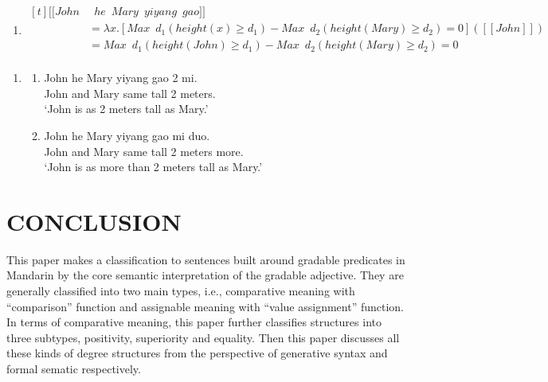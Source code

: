 \documentclass{ctexart}
\begin{document}
\begin{enumerate}
\begin{enumerate}
        \item \label{equality_example_3_d}
        $\begin{aligned}[t]
            [\![John &\enspace he \enspace Mary \enspace yiyang \enspace gao]\!] \\
            &= \lambda x.[Max \enspace d_1 (height(x) \geq d_1) - Max \enspace d_2 (height(Mary) \geq d_2) = 0]([\![John]\!]) \\
            &= Max \enspace d_1 (height(John) \geq d_1) - Max \enspace d_2 (height(Mary) \geq d_2) = 0 \\
        \end{aligned}$
    \end{enumerate}
\end{enumerate}

\begin{enumerate}
    \item \label{equality_example_1}
    \begin{enumerate}
        \item \label{equality_example_1_a}
        John he \enspace Mary yiyang gao 2 mi. \\
        John and Mary \enspace same tall 2 meters. \\
        `John is as 2 meters tall as Mary.'

        \item \label{equality_example_1_b}
        John he \enspace Mary yiyang gao  mi \enspace \enspace duo. \\
        John and Mary \enspace same tall 2 meters more. \\
        `John is as more than 2 meters tall as Mary.'
    \end{enumerate}
\end{enumerate}

\section{CONCLUSION}

\noindent
This paper makes a classification to sentences built around gradable predicates in Mandarin by the core semantic interpretation of the gradable adjective. They are generally classified into two main types, i.e., comparative meaning with ``comparison'' function and assignable meaning with ``value assignment'' function. In terms of comparative meaning, this paper further classifies structures into three subtypes, positivity, superiority and equality. Then this paper discusses all these kinds of degree structures from the perspective of generative syntax and formal sematic respectively. 
\end{document}
